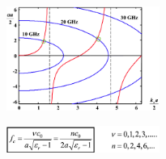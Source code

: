 \documentclass[english]{latex4ei/latex4ei_sheet}
\begin{document}
\begin{sectionbox}
	\begin{center}\includegraphics[width = 5cm]{./img/dielektr-g2.png}\end{center}
	\begin{center}\includegraphics[width = 5cm]{./img/dielektr-gfc.png}\end{center}

\end{sectionbox}
\end{document}

